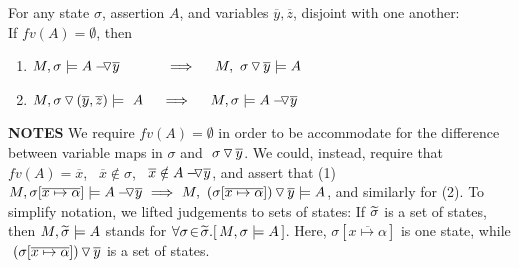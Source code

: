 {{\begin{lemma} 
\label{lemma:push:ass:state}
For any state  $\sigma$, assertion $A$, and variables   $\overline y, \overline z$, disjoint with one another:
\\
If  $fv(A)=\emptyset$, then
\begin{enumerate}
 \item
 \label{lemma:push:ass:state:one}
$M, \sigma \models \PushAS {y} {A}\ \ \ \ \ \ \  \ \ \    \Longrightarrow  \ \ \ \ M,  \PushS {y} {\sigma}   \models A$
\item
\label{lemma:push:ass:state:two}
$M, { \PushSLong {(\overline y, \overline z)} {\sigma} } \models\  A \  \ \ \ \Longrightarrow  \ \ \ \ M,  \sigma \models  \PushAS  {y} {A}$
\end{enumerate}
\end{lemma}


\noindent
\textbf{NOTES} \notesep 
{We require   $fv(A)=\emptyset$ in order to be accommodate for the difference between variable maps in $\sigma$ and  $\PushS {y} {\sigma}$.
We could, instead,  require that $fv(A)=\overline x$, \ $\overline x \notin \sigma$, \ $\overline x \notin  \PushAS {y} {A}$, and   assert that (1)\ $M, \sigma[\overline{x \mapsto \alpha} ] \models \PushAS {y} {A}\  \Longrightarrow   \ M,  \PushS {y} {(\sigma[\overline{x \mapsto \alpha}])}   \models A$, and similarly for (2).}
 \notesep 
To simplify notation,  we lifted %
judgements to sets of states: If  $\sigmas$ is a set of states,  then
$M,   \sigmas \models A$ stands for  $\forall\sigma\! \in\! \sigmas.[\, M,\sigma \models A \, ]$. Here, $\sigma[\overline{x \mapsto \alpha} ]$ is one state, while 
 $\PushS {y} {(\sigma[\overline{x \mapsto \alpha}])}$ is a set of states. 
   

}}
